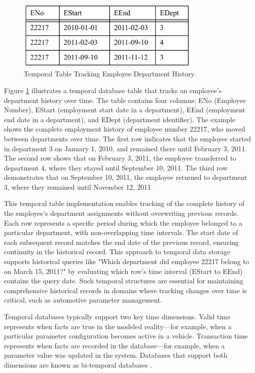 \begin{figure}[ht]
    \centering
    \includegraphics[width=0.8\textwidth]{figures/temporal_database.png}
    \caption{Temporal Table Tracking Employee Department History}
    \label{fig:temporal-database}
\end{figure}

Figure \ref{fig:temporal-database} illustrates a temporal database table that tracks an employee's department history over time. The table contains four columns: ENo (Employee Number), EStart (employment start date in a department), EEnd (employment end date in a department), and EDept (department identifier). The example shows the complete employment history of employee number 22217, who moved between departments over time. The first row indicates that the employee started in department 3 on January 1, 2010, and remained there until February 3, 2011. The second row shows that on February 3, 2011, the employee transferred to department 4, where they stayed until September 10, 2011. The third row demonstrates that on September 10, 2011, the employee returned to department 3, where they remained until November 12, 2011.

This temporal table implementation enables tracking of the complete history of the employee's department assignments without overwriting previous records. Each row represents a specific period during which the employee belonged to a particular department, with non-overlapping time intervals. The start date of each subsequent record matches the end date of the previous record, ensuring continuity in the historical record. This approach to temporal data storage supports historical queries like "Which department did employee 22217 belong to on March 15, 2011?" by evaluating which row's time interval (EStart to EEnd) contains the query date. Such temporal structures are essential for maintaining comprehensive historical records in domains where tracking changes over time is critical, such as automotive parameter management.

Temporal databases typically support two key time dimensions. Valid time represents when facts are true in the modeled reality—for example, when a particular parameter configuration becomes active in a vehicle. Transaction time represents when facts are recorded in the database—for example, when a parameter value was updated in the system. Databases that support both dimensions are known as bi-temporal databases \cite{kulkarni2012temporal}.

